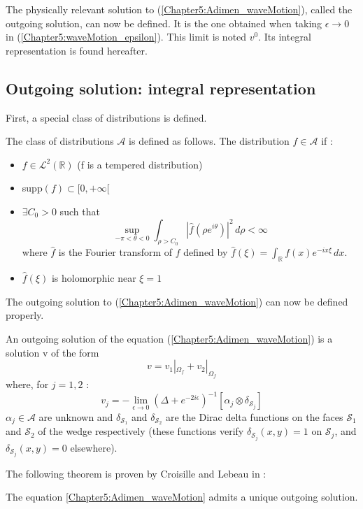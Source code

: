 The physically relevant solution to (\ref{Chapter5:Adimen_waveMotion}), called the outgoing solution, can now be defined. It is the one obtained when taking $\epsilon \to 0$ in (\ref{Chapter5:waveMotion_epsilon}). This limit is noted $v^0$. Its integral representation is found hereafter.

\subsection*{Outgoing solution: integral representation}
\label{integral_representation}

First, a special class of distributions is defined.
\begin{definition}
The class of distributions $\mathcal{A}$ is defined as follows. The distribution $f\in \mathcal{A}$ if :
\begin{itemize}
\item $f \in \mathcal{L}^2(\mathbb{R})$ (f is a tempered distribution)
\item supp$(f) \subset \lbrack 0,+\infty \lbrack$
\item $\exists C_0>0$ such that
$$ \sup_{-\pi<\theta<0} \int_{\rho>C_0}|\hat{f}(\rho e^{i\theta})|^2\,d\rho <\infty$$
where $\hat{f}$ is the Fourier transform of $f$ defined by $\hat{f}(\xi)=\int_{\mathbb{R}}f(x)e^{-ix\xi}\, dx$.
\item $\hat{f}(\xi)$ is holomorphic near $\xi=1$
\end{itemize}

\end{definition}
The outgoing solution to (\ref{Chapter5:Adimen_waveMotion}) can now be defined properly.

\begin{definition}
An outgoing solution of the equation (\ref{Chapter5:Adimen_waveMotion}) is a solution v of the form 
\begin{equation}
\label{Chapter5:decomposition}
v=v_1|_{\Omega_f}+v_2|_{\Omega_f}
\end{equation}
where, for $j=1,2$ :
\begin{equation}
\label{inv_potentiels}
v_j=-\lim_{\epsilon \to 0} \left(\Delta+e^{-2i\epsilon}\right)^{-1} \left[ \alpha_j \otimes \delta_{\mathcal{S}_j} \right]
\end{equation}
$\alpha_j \in \mathcal{A}$ are unknown and $\delta_{\mathcal{S}_1}$ and $\delta_{\mathcal{S}_2}$ are the Dirac delta functions on the faces $\mathcal{S}_1$ and $\mathcal{S}_2$ of the wedge respectively (these functions verify $\delta_{\mathcal{S}_j}(x,y)=1$ on $\mathcal{S}_j$, and $\delta_{\mathcal{S}_j}(x,y)=0$ elsewhere).

\end{definition}
The following theorem is proven by Croisille and Lebeau in \cite{CroisilleLebeau} :
\begin{theorem}
The equation \eqref{Chapter5:Adimen_waveMotion} admits a unique outgoing solution.
\end{theorem}

